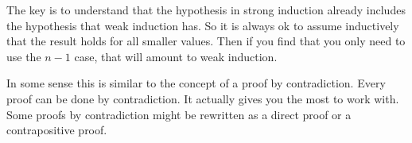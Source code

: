 \documentclass[12pt]{article}
\begin{document}
The key is to understand that the hypothesis in strong induction already includes the hypothesis that weak induction has. So it is always ok to assume inductively that the result holds for all smaller values. Then if you find that you only need to use the $n-1$ case, that will amount to weak induction. 

In some sense this is similar to the concept of a proof by contradiction. Every proof can be done by contradiction. It actually gives you the most to work with. Some proofs by contradiction might be rewritten as a direct proof or a contrapositive proof. 
\end{document}
